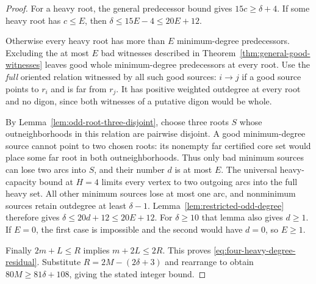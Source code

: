 \begin{proof}
For a heavy root, the general predecessor bound gives
$15c\ge\delta+4$.
If some heavy root has $c\le E$, then
$\delta\le15E-4\le20E+12$.

Otherwise every heavy root has more than $E$ minimum-degree
predecessors.  Excluding the at most $E$ bad witnesses described
in Theorem~\ref{thm:general-good-witnesses} leaves good whole
minimum-degree predecessors at every root.
Use the \emph{full} oriented relation witnessed by all such good
sources: $i\to j$ if a good source points to $r_i$ and is far
from $r_j$.  It has positive weighted outdegree at every root
and no digon, since both witnesses of a putative digon would
be whole.

By Lemma~\ref{lem:odd-root-three-disjoint}, choose three roots $S$
whose outneighborhoods in this relation are pairwise disjoint.
A good minimum-degree source cannot point to two chosen roots:
its nonempty far certified core set would place some far root
in both outneighborhoods.  Thus only bad minimum sources can
lose two arcs into $S$, and their number $d$ is at most $E$.
The universal heavy-capacity bound at $H=4$ limits every vertex
to two outgoing arcs into the full heavy set.  All other
minimum sources lose at most one arc, and nonminimum sources
retain outdegree at least $\delta-1$.
Lemma~\ref{lem:restricted-odd-degree} therefore gives
$\delta\le20d+12\le20E+12$.
For $\delta\ge10$ that lemma also gives $d\ge1$.
If $E=0$, the first case is impossible and the second would have
$d=0$, so $E\ge1$.

Finally $2m+L\le R$ implies $m+2L\le2R$.
This proves \eqref{eq:four-heavy-degree-residual}.
Substitute $R=2M-(2\delta+3)$ and rearrange to obtain
$80M\ge81\delta+108$, giving the stated integer bound.
\end{proof}
